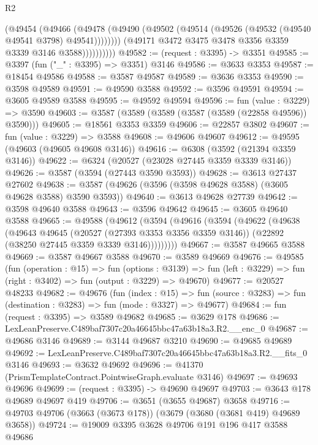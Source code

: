 \begin{lexlean}{R2}
\begin{coremodule}
                      (@49454
                        (@49466
                          (@49478
                            (@49490
                              (@49502 (@49514 (@49526 (@49532 (@49540 @49541 @3798) @49541))))))))
                      (@49171 @3472 @3475 @3478 @3356 @3359 @3339 @3146 @3588))))))))))
@49582 := (request : @3395) -> @3351
@49585 := @3397 (fun ("_" : @3395) => @3351) @3146
@49586 := @3633 @3353
@49587 := @18454 @49586
@49588 := @3587 @49587
@49589 := @3636 @3353
@49590 := @3598 @49589
@49591 := @49590 @3588
@49592 := @3596 @49591
@49594 := @3605 @49589 @3588
@49595 := @49592 @49594
@49596 := fun (value : @3229) => @3590
@49603 := @3587 (@3589 (@3589 (@3587 (@3589 (@22858 @49596)) @3590)))
@49605 := @18561 @3353 @3359
@49606 := @22857 @3802
@49607 := fun (value : @3229) => @3588
@49608 := @49606 @49607
@49612 := @49595 (@49603 (@49605 @49608 @3146))
@49616 := @6308 (@3592 (@21394 @3359 @3146))
@49622 := @6324 (@20527 (@23028 @27445 @3359 @3339 @3146))
@49626 := @3587 (@3594 (@27443 @3590 @3593))
@49628 := @3613 @27437 @27602
@49638 := @3587 (@49626 (@3596 (@3598 @49628 @3588) (@3605 @49628 @3588) @3590 @3593))
@49640 := @3613 @49628 @27739
@49642 := @3598 @49640 @3588
@49643 := @3596 @49642
@49645 := @3605 @49640 @3588
@49665 := @49588
    (@49612
      (@3594
        (@49616
          (@3594
            (@49622
              (@49638
                (@49643
                  @49645
                  (@20527 (@27393 @3353 @3356 @3359 @3146))
                  (@22892 (@38250 @27445 @3359 @3339 @3146)))))))))
@49667 := @3587 @49665 @3588
@49669 := @3587 @49667 @3588
@49670 := @3589 @49669
@49676 := @49585
    (fun (operation : @15) =>
    fun (options : @3139) =>
    fun (left : @3229) => fun (right : @3402) => fun (output : @3229) => @49670)
@49677 := @20527 @48233
@49682 := @49676
    (fun (index : @15) =>
    fun (source : @3283) => fun (destination : @3283) => fun (mode : @3327) => @49677)
@49684 := fun (request : @3395) => @3589 @49682
@49685 := @3629 @178
@49686 := LexLeanPreserve.C489baf7307c20a46645bbc47a63b18a3.R2.__enc_0
@49687 := @49686 @3146
@49689 := @3144 @49687 @3210
@49690 := @49685 @49689
@49692 := LexLeanPreserve.C489baf7307c20a46645bbc47a63b18a3.R2.__fits_0 @3146
@49693 := @3632 @49692
@49696 := @41370 (PrismTemplateContract.PointwiseGraph.evaluate @3146)
@49697 := @49693 @49696
@49699 := (request : @3395) -> @49690 @49697
@49703 := @3643 @178 @49689 @49697 @419
@49706 := @3651 (@3655 @49687) @3658
@49716 := @49703 @49706 (@3663 (@3673 @178)) (@3679 (@3680 (@3681 @419) @49689 @3658))
@49724 := @19009 @3395 @3628 @49706 @191 @196 @417 @3588 @49686

\end{coremodule}
\end{lexlean}
